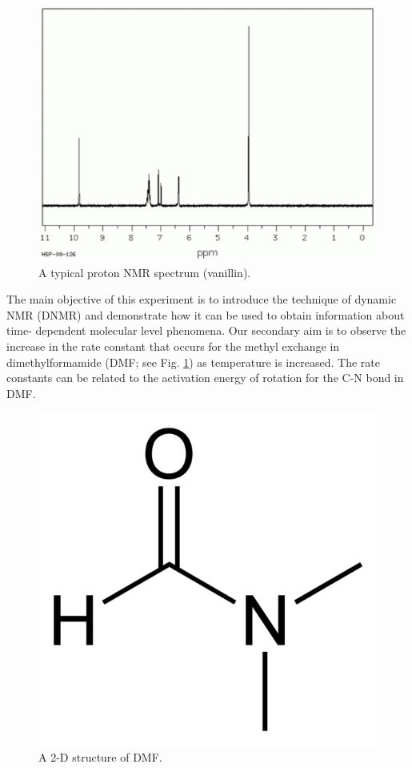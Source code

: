 \documentclass[byrevtex,amssymb,aps,pra,floatfix,letterpaper]{revtex4}
\begin{document}
\begin{figure}[!htp]
\begin{center}
\includegraphics[scale=0.5]{fig1}
\caption{A typical proton NMR spectrum (vanillin).}
\label{fig1}
\end{center}
\end{figure}

The main objective of this experiment is to introduce the technique of dynamic NMR (DNMR) and demonstrate how it can be used to obtain information about time-
dependent molecular level phenomena. Our secondary aim is to observe the increase in the rate constant that occurs for the methyl exchange in dimethylformamide (DMF; see Fig. \ref{fig1}) as temperature is increased. The rate constants can be related to the activation energy of rotation for the C-N bond in DMF.

\begin{figure}[!htp]
\begin{center}
\includegraphics[scale=0.1]{fig2}
\caption{A 2-D structure of DMF.}
\label{fig2}
\end{center}
\end{figure}
\end{document}
